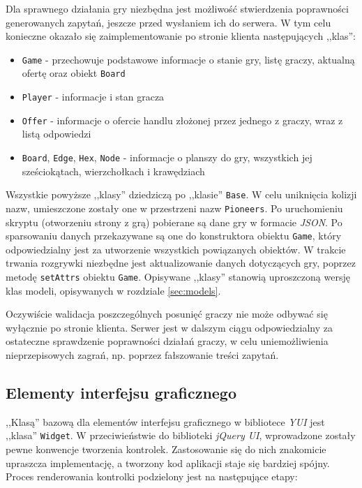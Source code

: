 \documentclass[a4paper,12pt]{article}
\begin{document}
Dla sprawnego działania gry niezbędna jest możliwość stwierdzenia
poprawności generowanych zapytań, jeszcze przed wysłaniem ich do
serwera. W tym celu konieczne okazało się zaimplementowanie po stronie
klienta następujących ,,klas'':

\begin{itemize}
\item \texttt{Game} - przechowuje podstawowe informacje o stanie gry,
  listę graczy, aktualną ofertę oraz obiekt \texttt{Board}
\item \texttt{Player} - informacje i stan gracza
\item \texttt{Offer} - informacje o ofercie handlu złożonej przez
  jednego z graczy, wraz z listą odpowiedzi
\item \texttt{Board}, \texttt{Edge}, \texttt{Hex}, \texttt{Node} -
  informacje o planszy do gry, wszystkich jej sześciokątach,
  wierzchołkach i krawędziach
\end{itemize}

Wszystkie powyższe ,,klasy'' dziedziczą po ,,klasie'' \texttt{Base}. W
celu uniknięcia kolizji nazw, umieszczone zostały one w przestrzeni
nazw \texttt{Pioneers}. Po uruchomieniu skryptu (otworzeniu strony z
grą) pobierane są dane gry w formacie \emph{JSON}. Po sparsowaniu
danych przekazywane są one do konstruktora obiektu \texttt{Game},
który odpowiedzialny jest za utworzenie wszystkich powiązanych
obiektów. W trakcie trwania rozgrywki niezbędne jest aktualizowanie
danych dotyczących gry, poprzez metodę \texttt{setAttrs} obiektu
\texttt{Game}. Opisywane ,,klasy'' stanowią uproszczoną wersję klas
modeli, opisywanych w rozdziale \ref{sec:models}.

Oczywiście walidacja poszczególnych posunięć graczy nie może odbywać
się wyłącznie po stronie klienta. Serwer jest w dalszym ciągu
odpowiedzialny za ostateczne sprawdzenie poprawności działań graczy, w
celu uniemożliwienia nieprzepisowych zagrań, np. poprzez fałszowanie
treści zapytań.

\subsection{Elementy interfejsu graficznego}

,,Klasą'' bazową dla elementów interfejsu graficznego w bibliotece
\emph{YUI} jest ,,klasa'' \texttt{Widget}. W przeciwieństwie do
biblioteki \emph{jQuery UI}, wprowadzone zostały pewne konwencje
tworzenia kontrolek. Zastosowanie się do nich znakomicie upraszcza
implementację, a tworzony kod aplikacji staje się bardziej
spójny. Proces renderowania kontrolki podzielony jest na następujące
etapy:
\end{document}
